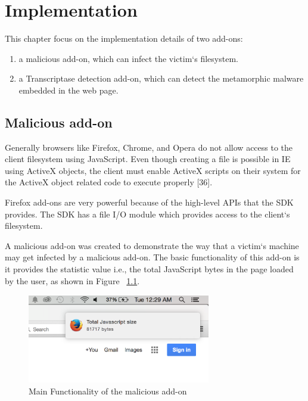 \chapter{Implementation}

This chapter focus on the implementation details of two add-ons:
\begin{enumerate}
\item a malicious add-on, which can infect the victim`s filesystem.
\item a Transcriptase detection add-on, which can detect the metamorphic malware embedded in the web page.
\end{enumerate}

\section{Malicious add-on}

Generally browsers like Firefox, Chrome, and Opera do not allow access to the client filesystem using JavaScript. Even though creating a file is possible in IE using ActiveX objects, the client must enable ActiveX scripts on their system for the ActiveX object related code to execute properly [36]. 

Firefox add-ons are very powerful because of the high-level APIs that the SDK provides. The SDK has a file I/O module which provides access to the client`s filesystem.

A malicious add-on was created to demonstrate the way that a victim`s machine may get infected by a malicious add-on. The basic functionality of this add-on is it provides the statistic value i.e., the total JavaScript bytes in the page loaded by the user, as shown in Figure ~\ref{fig:maliciousaddon}.

\begin{figure}
    \centering    
    \includegraphics[width=8cm, height=3.9cm]{maliciousaddon.png}
    \caption[Main Functionality of the malicious add-on]{Main Functionality of the malicious add-on}
    \label{fig:maliciousaddon}
\end{figure}


